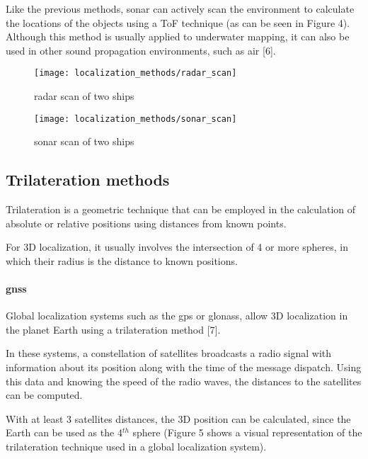 Like the previous methods, \gls{sonar} can actively scan the environment to calculate the locations of the objects using a ToF technique (as can be seen in Figure 4). Although this method is usually applied to underwater mapping, it can also be used in other sound propagation environments, such as air [6].

\begin{figure}
	\centering
	\begin{minipage}[h]{.49\textwidth}
		\centering
		\texttt{[image: localization\_methods/radar\_scan]}
		\caption{\gls{radar} scan of two ships}
		\label{fig:localization_methods_radar-scan}
	\end{minipage}\hfill
	\begin{minipage}[h]{.49\textwidth}
		\centering
		\texttt{[image: localization\_methods/sonar\_scan]}
		\caption{\gls{sonar} scan of two ships}
		\label{fig:localization_methods_sonar-scan}
	\end{minipage}
\end{figure}


\subsection{Trilateration methods}

Trilateration is a geometric technique that can be employed in the calculation of absolute or relative positions using distances from known points.

For 3D localization, it usually involves the intersection of 4 or more spheres, in which their radius is the distance to known positions.

\paragraph{ \gls{gnss}}

Global localization systems such as the \gls{gps} or \gls{glonass}, allow 3D localization in the planet Earth  using a trilateration method [7].

In these systems, a constellation of satellites broadcasts a radio signal with information about its position along with the time of the message dispatch. Using this data and knowing the speed of the radio waves, the distances to the satellites can be computed.

With at least 3 satellites distances, the 3D position can be calculated, since the Earth can be used as the 4${}^{th}$ sphere (Figure 5 shows a visual representation of the trilateration technique used in a global localization system).

